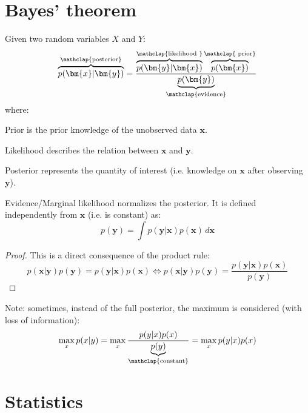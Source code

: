 \section{Bayes' theorem}
\begin{theorem}
    Given two random variables $X$ and $Y$:
    \[
        \overbrace{p(\bm{x} \vert \bm{y})}^{\mathclap{\text{posterior}}} = 
            \frac
                { \overbrace{p(\bm{y} \vert \bm{x})}^{\mathclap{\text{likelihood }}}  \overbrace{p(\bm{x})}^{\mathclap{\text{ prior}}} }
                {\underbrace{p(\bm{y})}_{\mathclap{\text{evidence}}}} 
    \]
    where:
    \begin{descriptionlist}
        \item[Prior] 
            is the prior knowledge of the unobserved data $\bm{x}$.

        \item[Likelihood] 
            describes the relation between $\bm{x}$ and $\bm{y}$.

        \item[Posterior] 
            represents the quantity of interest (i.e. knowledge on $\bm{x}$ after observing $\bm{y}$).
        
        \item[Evidence/Marginal likelihood] 
            normalizes the posterior. It is defined independently from $\bm{x}$ (i.e. is constant) as:
            \[ p(\bm{y}) = \int p(\bm{y} \vert \bm{x}) p(\bm{x}) \,d\bm{x} \]
    \end{descriptionlist}
\end{theorem}
\begin{proof}
    This is a direct consequence of the product rule:
    \[ 
        p(\bm{x} \vert \bm{y}) p(\bm{y}) = p(\bm{y} \vert \bm{x}) p(\bm{x}) \iff
        p(\bm{x} \vert \bm{y}) p(\bm{y}) = \frac{p(\bm{y} \vert \bm{x}) p(\bm{x})}{p(\bm{y})}
    \]
\end{proof}

Note: sometimes, instead of the full posterior, the maximum is considered (with loss of information):
\[ \max_x p(x \vert y) = \max_x \frac{p(y \vert x) p(x)}{\underbrace{p(y)}_{\mathclap{\text{constant}}}} = \max_x p(y \vert x) p(x) \]



\section{Statistics}

